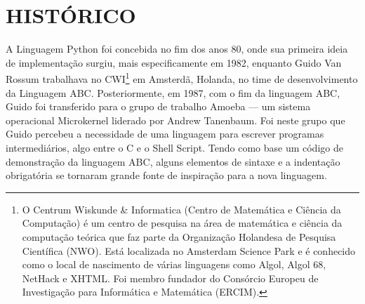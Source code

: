 
\chapter{HISTÓRICO}
\label{chap:fundamentacaoTeorica}

A Linguagem Python foi concebida no fim dos anos 80, onde sua primeira ideia de implementação surgiu, mais especificamente em 1982, enquanto Guido Van Rossum trabalhava no CWI\footnote{
    O Centrum Wiskunde \& Informatica (Centro de Matemática e Ciência da Computação) é um centro de pesquisa na área de matemática e ciência da computação teórica que faz parte da Organização Holandesa de Pesquisa Científica (NWO).
    Está localizada no Amsterdam Science Park e é conhecido como o local de nascimento de várias linguagens como Algol, Algol 68, NetHack e XHTML.
    Foi membro fundador do Consórcio Europeu de Investigação para Informática e Matemática (ERCIM).
} em Amsterdã, Holanda, no time de desenvolvimento da Linguagem ABC.
Posteriormente, em 1987, com o fim da linguagem ABC, Guido foi transferido para o grupo de trabalho Amoeba — um sistema operacional Microkernel liderado por Andrew Tanenbaum. Foi neste grupo que Guido percebeu a necessidade de uma linguagem para escrever programas intermediários, algo entre o C e o Shell Script.
Tendo como base um código de demonstração da linguagem ABC, alguns elementos de sintaxe e a indentação obrigatória se tornaram grande fonte de inspiração para a nova linguagem.

